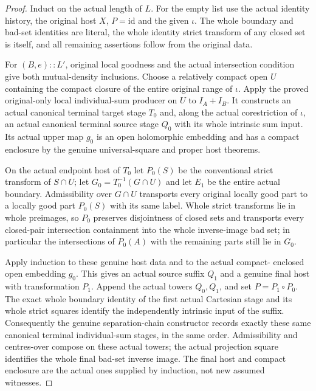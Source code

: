\begin{proof}
Induct on the actual length of $L$. For the empty list use the actual
identity history, the original host $X$, $P=\mathrm{id}$ and the given
$\iota$. The whole boundary and bad-set identities are literal, the
whole identity strict transform of any closed set is itself, and all
remaining assertions follow from the original data.

For $(B,e)::L'$, original local goodness and the actual intersection
condition give both mutual-density inclusions. Choose a relatively
compact open $U$ containing the compact closure of the entire original
range of $\iota$. Apply the proved original-only local individual-sum
producer on $U$ to $I_A+I_B$. It constructs an actual canonical terminal
target stage $T_0$ and, along the actual corestriction of $\iota$, an
actual canonical terminal source stage $Q_0$ with its whole intrinsic
sum input. Its actual upper map $g_0$ is an open holomorphic embedding
and has a compact enclosure by the genuine universal-square and proper
host theorems.

On the actual endpoint host of $T_0$ let $P_0(S)$ be the conventional
strict transform of $S\cap U$; let $G_0=T_0^{-1}(G\cap U)$ and let
$E_1$ be the entire actual boundary. Admissibility over $G\cap U$
transports every original locally good part to a locally good part
$P_0(S)$ with its same label. Whole strict transforms lie in whole
preimages, so $P_0$ preserves disjointness of closed sets and transports every closed-pair
intersection containment into the whole inverse-image bad set; in
particular the intersections of
$P_0(A)$ with the remaining parts still lie in $G_0$.

Apply induction to these genuine host data and to the actual compact-
enclosed open embedding $g_0$. This gives an actual source suffix
$Q_1$ and a genuine final host with transformation $P_1$. Append the
actual towers $Q_0,Q_1$, and set $P=P_1\circ P_0$. The exact whole
boundary identity of the first actual Cartesian stage and its whole
strict squares identify the independently intrinsic input of the suffix.
Consequently the genuine separation-chain constructor records exactly
these same canonical terminal individual-sum stages, in the same order.
Admissibility and centres-over compose on these actual towers; the
actual projection square identifies the whole final bad-set inverse
image. The final host and compact enclosure are the actual ones supplied
by induction, not new assumed witnesses.


\end{proof}
